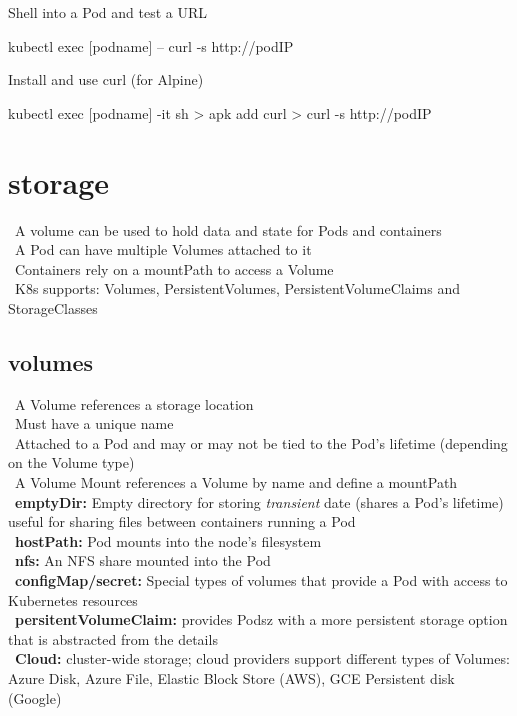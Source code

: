 \documentclass{refcard}
\begin{document}
Shell into a Pod and test a URL
\begin{ttyenv}
kubectl exec [podname] -- curl -s http://podIP
\end{ttyenv}

Install and use curl (for Alpine)
\begin{ttyenv}
kubectl exec [podname] -it sh
> apk add curl
> curl -s http://podIP
\end{ttyenv}

\section{storage}

\textbullet\ A volume can be used to hold data and state for Pods and containers\\
\textbullet\ A Pod can have multiple Volumes attached to it\\
\textbullet\ Containers rely on a mountPath to access a Volume\\
\textbullet\ K8s supports: Volumes, PersistentVolumes, PersistentVolumeClaims and StorageClasses\\

\subsection{volumes}

\textbullet\ A Volume references a storage location\\
\textbullet\ Must have a unique name\\
\textbullet\ Attached to a Pod and may or may not be tied to the Pod's lifetime (depending on the Volume type)\\
\textbullet\ A Volume Mount references a Volume by name and define a mountPath\\

\textbullet\ \textbf{emptyDir:} Empty directory for storing \textit{transient} date (shares a Pod's lifetime) useful for sharing files between containers running a Pod\\
\textbullet\ \textbf{hostPath:} Pod mounts into the node's filesystem\\
\textbullet\ \textbf{nfs:} An NFS share mounted into the Pod\\
\textbullet\ \textbf{configMap/secret:} Special types of volumes that provide a Pod with access to Kubernetes resources\\
\textbullet\ \textbf{persitentVolumeClaim:} provides Podsz with a more persistent storage option that is abstracted from the details\\
\textbullet\ \textbf{Cloud:} cluster-wide storage; cloud providers support different types of Volumes: Azure Disk, Azure File, Elastic Block Store (AWS), GCE Persistent disk (Google)\\
  
\end{document}
